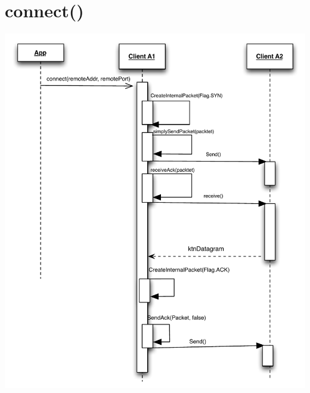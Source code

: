 \documentclass{article}
\begin{document}
\section{connect()}
\includegraphics[scale=0.8]{ktnConnect.pdf}
\end{document}
